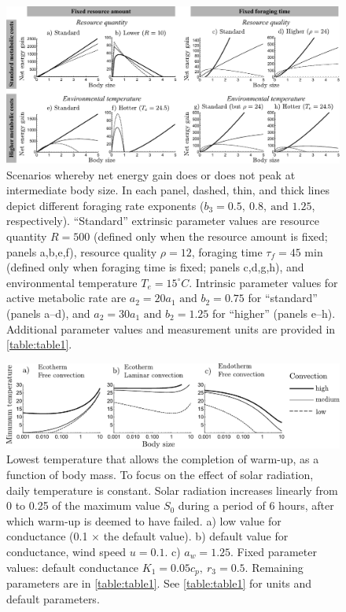 \begin{figure}[H]
\includegraphics[width=\textwidth]{fig2}
\caption{
    \setstretch{\stretchby}
    Scenarios whereby net energy gain does or does not peak at intermediate body size.
    In each panel, dashed, thin, and thick lines depict different foraging rate exponents ($b_3 = 0.5,\ 0.8,\ \text{and } 1.25$, respectively).
    ``Standard'' extrinsic parameter values are 
    resource quantity $R = 500$ (defined only when the resource amount is fixed; panels a,b,e,f),
    resource quality $\rho = 12$,
    foraging time $\tau_f = 45 \text{ min}$ (defined only when foraging time is fixed; panels c,d,g,h), 
    and environmental temperature $T_e = 15^\circ C$.
    Intrinsic parameter values for active metabolic rate are $a_2 = 20 a_1 \text{ and } b_2 = 0.75$ for ``standard'' (panels a--d), and $a_2 = 30 a_1 \text{ and } b_2  = 1.25$ for ``higher'' (panels e--h).
    Additional parameter values and measurement units are provided in \cref{table:table1}.
}
\label{fig2}
\end{figure}

\begin{figure}[H]
\includegraphics[width=\textwidth]{fig3}
\caption{
    \setstretch{\stretchby}
	Lowest temperature that allows the completion of warm-up, as a function of body mass.
	To focus on the effect of solar radiation, daily temperature is constant.
	Solar radiation increases linearly from 0 to 0.25 of the maximum value $S_0$ during a period of 6 hours, after which warm-up is deemed to have failed.
	a)  low value for conductance (0.1 $\times$ the default value).
	b) default value for conductance, wind speed  $u = 0.1$.
	c)  $a_w = 1.25$.
	Fixed parameter values: default conductance $K_1 = 0.05c_p,\ r_3 = 0.5$.
	Remaining parameters are in \cref{table:table1}.
	See \cref{table:table1} for units and default parameters.
}
\label{fig3}
\end{figure}

